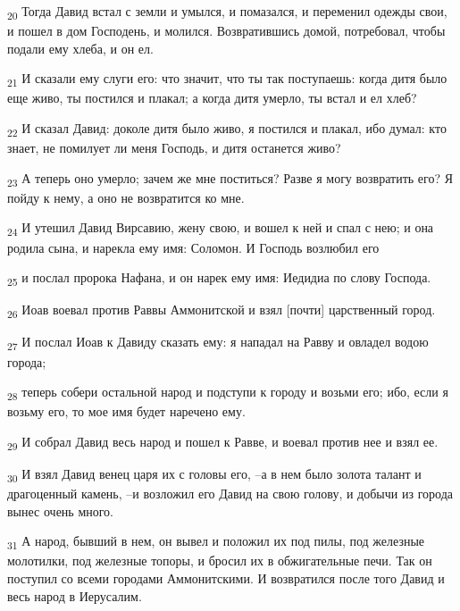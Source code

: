 \begin{tcolorbox}
\textsubscript{20} Тогда Давид встал с земли и умылся, и помазался, и переменил одежды свои, и пошел в дом Господень, и молился. Возвратившись домой, потребовал, чтобы подали ему хлеба, и он ел.
\end{tcolorbox}
\begin{tcolorbox}
\textsubscript{21} И сказали ему слуги его: что значит, что ты так поступаешь: когда дитя было еще живо, ты постился и плакал; а когда дитя умерло, ты встал и ел хлеб?
\end{tcolorbox}
\begin{tcolorbox}
\textsubscript{22} И сказал Давид: доколе дитя было живо, я постился и плакал, ибо думал: кто знает, не помилует ли меня Господь, и дитя останется живо?
\end{tcolorbox}
\begin{tcolorbox}
\textsubscript{23} А теперь оно умерло; зачем же мне поститься? Разве я могу возвратить его? Я пойду к нему, а оно не возвратится ко мне.
\end{tcolorbox}
\begin{tcolorbox}
\textsubscript{24} И утешил Давид Вирсавию, жену свою, и вошел к ней и спал с нею; и она родила сына, и нарекла ему имя: Соломон. И Господь возлюбил его
\end{tcolorbox}
\begin{tcolorbox}
\textsubscript{25} и послал пророка Нафана, и он нарек ему имя: Иедидиа по слову Господа.
\end{tcolorbox}
\begin{tcolorbox}
\textsubscript{26} Иоав воевал против Раввы Аммонитской и взял [почти] царственный город.
\end{tcolorbox}
\begin{tcolorbox}
\textsubscript{27} И послал Иоав к Давиду сказать ему: я нападал на Равву и овладел водою города;
\end{tcolorbox}
\begin{tcolorbox}
\textsubscript{28} теперь собери остальной народ и подступи к городу и возьми его; ибо, если я возьму его, то мое имя будет наречено ему.
\end{tcolorbox}
\begin{tcolorbox}
\textsubscript{29} И собрал Давид весь народ и пошел к Равве, и воевал против нее и взял ее.
\end{tcolorbox}
\begin{tcolorbox}
\textsubscript{30} И взял Давид венец царя их с головы его, --а в нем было золота талант и драгоценный камень, --и возложил его Давид на свою голову, и добычи из города вынес очень много.
\end{tcolorbox}
\begin{tcolorbox}
\textsubscript{31} А народ, бывший в нем, он вывел и положил их под пилы, под железные молотилки, под железные топоры, и бросил их в обжигательные печи. Так он поступил со всеми городами Аммонитскими. И возвратился после того Давид и весь народ в Иерусалим.
\end{tcolorbox}
